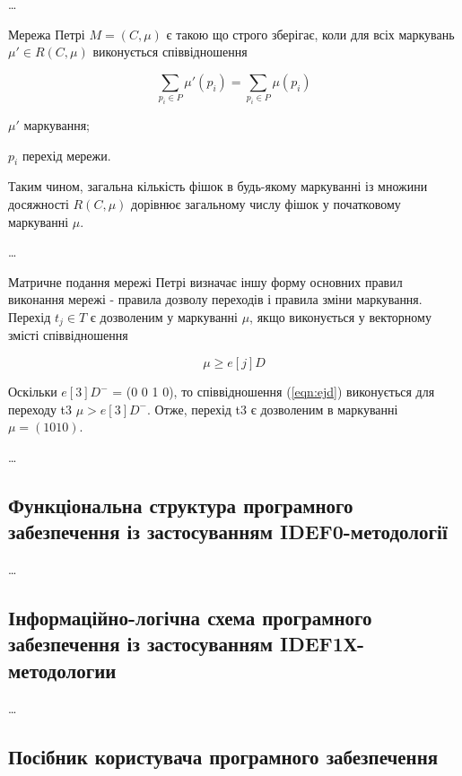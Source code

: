 \ldots

Мережа Петрі $M = (C, \mu)$ є такою що строго зберігає, коли для всіх маркувань
$\mu' \in R(C, \mu)$ виконується співвідношення

\begin{equation}
\sum_{p_i \in P}{\mu'(p_i)}=\sum_{p_i \in P}{\mu(p_i)}
\end{equation}

\begin{formulaDescription}
\item[$\mu'$] маркування;
\item[$p_i$] перехід мережи.
\end{formulaDescription}

Таким чином, загальна кількість фішок в будь-якому маркуванні із множини
досяжності $R(C, \mu)$ дорівнює загальному числу фішок у початковому маркуванні
$\mu$.

\ldots

Матричне подання мережі Петрі визначає іншу форму основних правил виконання
мережі - правила дозволу переходів і правила зміни маркування. Перехід $t_j \in 
T$ є дозволеним у маркуванні $\mu$, якщо виконується у векторному змісті
співвідношення

\begin{equation}\label{eqn:ejd}
\mu \geq e[j] D
\end{equation}

Оскільки $e[3] D^{-}$ = (0 0 1 0), то співвідношення (\ref{eqn:ejd}) виконується
для переходу t3 $\mu > e[3] D^{-}$. Отже, перехід t3 є дозволеним в
маркуванні $\mu = ( 1 0 1 0 )$.

\ldots

\subsection{Функціональна структура програмного забезпечення із застосуванням
IDEF0-методології}

\ldots

\subsection{Інформаційно-логічна схема програмного забезпечення із застосуванням
IDEF1Х-методологии}

\ldots

\subsection{Посібник користувача програмного забезпечення}

